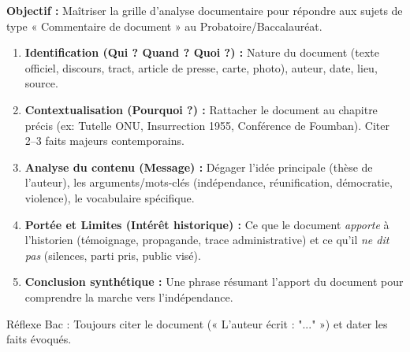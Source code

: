 \documentclass[11pt]{article}
\newcommand{\cle}[1]{{\popxbold\color{popdark}#1}}
\begin{document}
\begin{methode}
\textbf{Objectif :} Maîtriser la grille d'analyse documentaire pour répondre aux sujets de type « Commentaire de document » au Probatoire/Baccalauréat.
\begin{enumerate}
    \item \textbf{Identification (Qui ? Quand ? Quoi ?) :} Nature du document (texte officiel, discours, tract, article de presse, carte, photo), auteur, date, lieu, source.
    \item \textbf{Contextualisation (Pourquoi ?) :} Rattacher le document au chapitre précis (ex: Tutelle ONU, Insurrection 1955, Conférence de Foumban). Citer 2--3 faits majeurs contemporains.
    \item \textbf{Analyse du contenu (Message) :} Dégager l'idée principale (thèse de l'auteur), les arguments/mots-clés (\cle{indépendance}, \cle{réunification}, \cle{démocratie}, \cle{violence}), le vocabulaire spécifique.
    \item \textbf{Portée et Limites (Intérêt historique) :} Ce que le document \emph{apporte} à l'historien (témoignage, propagande, trace administrative) et ce qu'il \emph{ne dit pas} (silences, parti pris, public visé).
    \item \textbf{Conclusion synthétique :} Une phrase résumant l'apport du document pour comprendre la marche vers l'indépendance.
\end{enumerate}
\cle{Réflexe Bac :} Toujours citer le document (« L'auteur écrit : "..." ») et dater les faits évoqués.
\end{methode}
\end{document}
